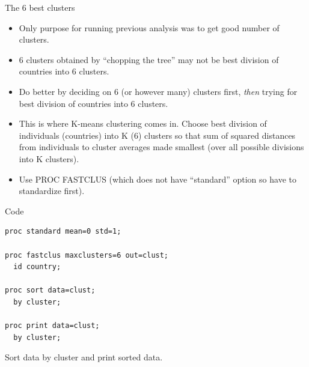 \documentclass[pdf]{prosper}
\begin{document}
\begin{slide}{The 6 best clusters}

  \begin{itemize}
  \item Only purpose for running previous analysis was to get good number of clusters.
  \item 6 clusters obtained by ``chopping the tree'' may not be best division of countries into 6 clusters.
  \item Do better by deciding on 6 (or however many) clusters first, {\em then} trying for best division of countries into 6 clusters.
  \item This is where K-means clustering comes in. Choose best division of individuals (countries) into K (6) clusters so that sum of squared distances from individuals to cluster averages made smallest (over all possible divisions into K clusters).
  \item Use PROC FASTCLUS (which does not have ``standard'' option so have to standardize first).
\end{itemize}

\end{slide}

\begin{slide}{Code}

\begin{verbatim}
proc standard mean=0 std=1;

proc fastclus maxclusters=6 out=clust;
  id country;

proc sort data=clust;
  by cluster;

proc print data=clust;
  by cluster;
\end{verbatim}

Sort data by cluster and print sorted data.
  
\end{slide}
\end{document}
